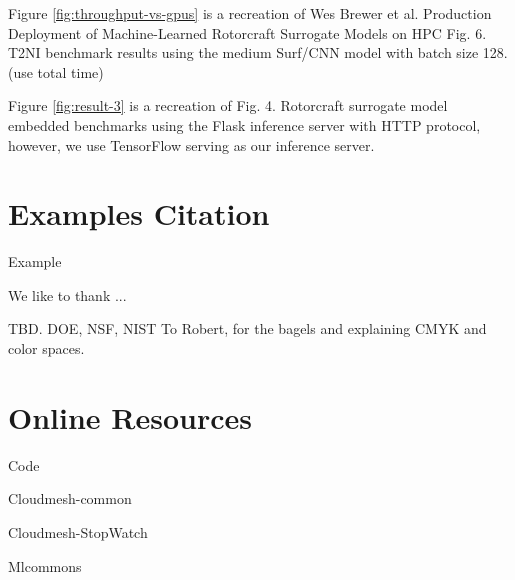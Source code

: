 \documentclass[sigplan,screen,noacm]{acmart}
\begin{document}
Figure \ref{fig:throughput-vs-gpus} is a recreation of Wes Brewer et al. Production Deployment of Machine-Learned Rotorcraft Surrogate Models on HPC Fig. 6. T2NI benchmark results using the medium Surf/CNN model with batch size 128. (use total time)

Figure \ref{fig:result-3} is a recreation of Fig. 4. Rotorcraft surrogate model embedded benchmarks using the Flask inference server with HTTP protocol, however, we use TensorFlow serving as our inference server.

\section{Examples Citation}

Example \cite{cloudmesh-hybrid-workflow}


\begin{acks}

We like to thank ...

TBD. DOE, NSF, NIST
To Robert, for the bagels and explaining CMYK and color spaces.
\end{acks}





\appendix

\section{Online Resources}

\begin{description}

\item{Code}
\item{Cloudmesh-common}
\item{Cloudmesh-StopWatch}
\item{Mlcommons}

\end{description}
\end{document}

